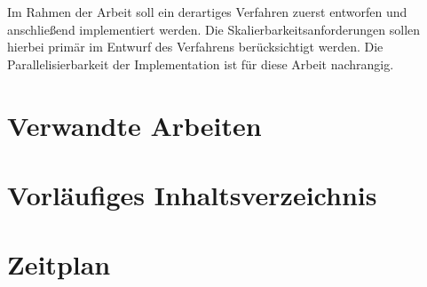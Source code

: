 \documentclass[11pt, a4paper]{scrreprt}
\begin{document}
Im Rahmen der Arbeit soll ein derartiges Verfahren zuerst entworfen und anschließend implementiert werden.
Die Skalierbarkeitsanforderungen sollen hierbei primär im Entwurf des Verfahrens berücksichtigt werden.
Die Parallelisierbarkeit der Implementation ist für diese Arbeit nachrangig.

\section{Verwandte Arbeiten}

\section{Vorläufiges Inhaltsverzeichnis}

\section{Zeitplan}
\end{document}
